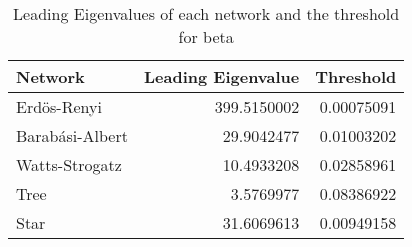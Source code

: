 \begin{table}[ht]
\centering
\begin{tabular}{lrr}
  \hline
Network & Leading Eigenvalue & Threshold \\ 
  \hline
Erdös-Renyi & 399.5150002 & 0.00075091 \\ 
  Barabási-Albert & 29.9042477 & 0.01003202 \\ 
  Watts-Strogatz & 10.4933208 & 0.02858961 \\ 
  Tree & 3.5769977 & 0.08386922 \\ 
  Star & 31.6069613 & 0.00949158 \\ 
   \hline
\end{tabular}
\caption{Leading Eigenvalues of each network and the threshold for beta \label{tab:eigens}}
\end{table}
